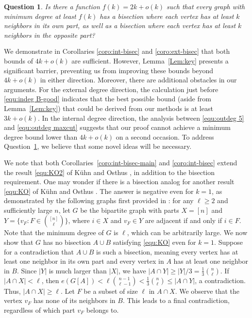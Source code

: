 \documentclass{aic}
\newtheorem{question}[dfn]{Question}
\begin{document}
	\begin{question}\label{que:2k}
		Is there a function $f(k) = 2k + o(k)$ such that every graph with minimum degree at least $f(k)$ has a bisection where each vertex has at least $k$ neighbors in its own part, as well as a bisection where each vertex has at least $k$ neighbors in the opposite part?
	\end{question}
	
	\noindent We demonstrate in Corollaries \ref{coro:int-bisec} and \ref{coro:ext-bisec} that both bounds of $4k + o(k)$ are sufficient. However, Lemma~\ref{Lem:key} presents a significant barrier, preventing us from improving these bounds beyond $4k + o(k)$ in either direction.
	Moreover, there are additional obstacles in our arguments. For the external degree direction,
	the calculation just before \eqref{equ:indeg B-good} indicates that the best possible bound (aside from Lemma~\ref{Lem:key}) that could be derived from our methods is at least $3k + o(k)$.
	In the internal degree direction, the analysis between \eqref{equ:outdeg 5} and \eqref{equ:outdeg maxcut} suggests that our proof cannot achieve a minimum degree bound lower than $4k + o(k)$ on a second occasion.
	To address Question~\ref{que:2k}, we believe that some novel ideas will be necessary.
	
	We note that both Corollaries~\ref{coro:int-bisec-main} and \ref{coro:int-bisec} extend the result \eqref{equ:KO2} of K\"uhn and Osthus \cite{KO}, in addition to the bisection requirement.
	One may wonder if there is a bisection analog for another result \eqref{equ:KO} of K\"uhn and Osthus \cite{KO}.
	The answer is negative even for $k=1$, as demonstrated by the following graphs first provided in \cite{KO}:
	for any $\ell \geq 2$ and sufficiently large $n$, let $G$ be the bipartite graph with parts $X = [n]$ and $Y = \{v_F : F \in \binom{[n]}{\ell}\}$, where $i \in X$ and $v_F \in Y$ are adjacent if and only if $i \in F$.
	Note that the minimum degree of $G$ is $\ell$, which can be arbitrarily large.
	We now show that $G$ has no bisection $A \cup B$ satisfying \eqref{equ:KO} even for $k=1$.
	Suppose for a contradiction that $A \cup B$ is such a bisection, meaning every vertex has at least one neighbor in its own part and every vertex in $A$ has at least one neighbor in $B$.
	Since $|Y|$ is much larger than $|X|$, we have $|A \cap Y| \geq |Y|/3 = \frac{1}{3} \binom{n}{\ell}$.
	If $|A \cap X| < \ell$, then $e(G[A]) < \ell \binom{n-1}{\ell-1} < \frac{1}{3} \binom{n}{\ell} \leq |A \cap Y|$, a contradiction.
	Thus, $|A \cap X| \geq \ell$. Let $F$ be a subset of size $\ell$ in $A \cap X$.
	We observe that the vertex $v_F$ has none of its neighbors in $B$. This leads to a final contradiction, regardless of which part $v_F$ belongs to.
	
\end{document}
